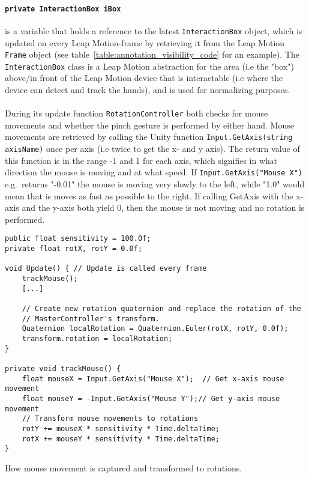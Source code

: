 \paragraph{\texttt{private InteractionBox iBox}}is a variable that holds a reference to the latest \texttt{InteractionBox} object, which is updated on every Leap Motion-frame by
                                                retrieving it from the Leap Motion \texttt{Frame} object (see table~\vref{table:annotation_visibility_code} for an example). 
                                                The \texttt{InteractionBox} class is a Leap Motion abstraction for the area (i.e the "box") above/in front of 
                                                the Leap Motion device that is interactable (i.e where the device can detect and track the hands), 
                                                and is used for normalizing purposes. 
\\\\
\noindent
During its update function \texttt{RotationController} both checks for mouse movements and whether the pinch gesture is performed by either hand.
Mouse movements are retrieved by calling the Unity function \texttt{Input.\-GetAxis(\-string axisName)} once per axis (i.e twice to get the x- and y axis). 
The return value of this function is in the range -1 and 1 for each axis, which signifies in what direction the mouse is moving and at what speed. 
If \texttt{Input.\-GetAxis(\-"Mouse X")} e.g.~returns "-0.01" the mouse is moving very slowly to the left, while "1.0" would mean that is moves as fast as possible to the right. 
If calling GetAxis with the x-axis and the y-axis both yield 0, then the mouse is not moving and no rotation is performed.

\begin{table}
\label{table:rotation_mouse_code}
\lstset{style=csharp}
\begin{lstlisting}
public float sensitivity = 100.0f;
private float rotX, rotY = 0.0f;

void Update() { // Update is called every frame
    trackMouse();
    [...]
    
    // Create new rotation quaternion and replace the rotation of the 
    // MasterController's transform. 
    Quaternion localRotation = Quaternion.Euler(rotX, rotY, 0.0f);
    transform.rotation = localRotation;         
}

private void trackMouse() {
    float mouseX = Input.GetAxis("Mouse X");  // Get x-axis mouse movement
    float mouseY = -Input.GetAxis("Mouse Y");// Get y-axis mouse movement
    // Transform mouse movements to rotations
    rotY += mouseX * sensitivity * Time.deltaTime; 
    rotX += mouseY * sensitivity * Time.deltaTime;   
}                                                                                
\end{lstlisting}
\caption[How mouse movement is captured and transformed to rotations]{How mouse movement is captured and transformed to rotations.} 
\end{table}

